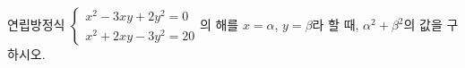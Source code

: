 연립방정식 $\begin{cases} x^2-3xy+2y^2=0 \\ x^2+2xy-3y^2=20 \end{cases}$의 해를 $x=\alpha$, $y=\beta$라 할 때, $\alpha^2+\beta^2$의 값을 구하시오.
